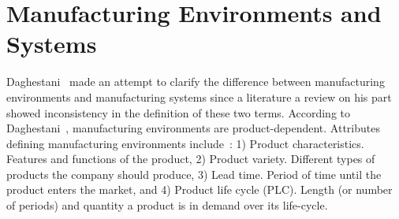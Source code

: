 \label{chapter:PRICE}


\section{Manufacturing Environments and Systems}
\label{chapter:environments}
Daghestani~\cite{Daghestani.1998} made an attempt to clarify the difference between manufacturing environments and manufacturing systems since a literature a review on his part showed inconsistency in the definition of these two terms. According to Daghestani~\cite{Daghestani.1998}, manufacturing environments are product-dependent. Attributes defining manufacturing environments include~\cite{Kingsman.1993,Brannon.1993,Donaldson.1995}: 1) Product characteristics. Features and functions of the product, 2) Product variety. Different types of products the company should produce, 3) Lead time. Period of time until the product enters the market, and 4) Product life cycle (PLC). Length (or number of periods) and quantity a product is in demand over its life-cycle.

